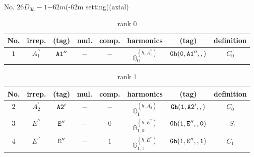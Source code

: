 \documentclass[fleqn,8pt]{jsarticle}
\begin{document}
\setcounter{MaxMatrixCols}{16}

\begin{center}
\LARGE
No. 26\quad$D_{3h}-1$\quad$-62m$\quad(-62m setting)\quad[ hexagonal ] (axial)
\end{center}
\begin{table}[ht!]
\begin{center}
\caption{rank 0}
\renewcommand{\arraystretch}{1.3}
\begin{tabular}{cccccccc} \hline \hline
No. & irrep. & (tag) & mul. & comp. & harmonics & (tag) & definition \\ \hline
$ 1 $ & $ A_{1}^{\prime\prime} $ & $ {\tt A1''} $ & $ - $ & $ - $ & $ \mathbb{G}_{0}^{(h,A_{1}^{\prime\prime})} $ & $ {\tt Gh(0,A1'',,)} $ & $ C_{0} $ \\
 \hline \hline
\end{tabular}
\end{center}
\end{table}
\begin{table}[ht!]
\begin{center}
\caption{rank 1}
\renewcommand{\arraystretch}{1.3}
\begin{tabular}{cccccccc} \hline \hline
No. & irrep. & (tag) & mul. & comp. & harmonics & (tag) & definition \\ \hline
$ 2 $ & $ A_{2}^{\prime} $ & $ {\tt A2'} $ & $ - $ & $ - $ & $ \mathbb{G}_{1}^{(h,A_{2}^{\prime})} $ & $ {\tt Gh(1,A2',,)} $ & $ C_{0} $ \\
$ 3 $ & $ E^{\prime\prime} $ & $ {\tt E''} $ & $ - $ & $ 0 $ & $ \mathbb{G}_{1,0}^{(h,E^{\prime\prime})} $ & $ {\tt Gh(1,E'',,0)} $ & $ - S_{1} $ \\
$ 4 $ & $ E^{\prime\prime} $ & $ {\tt E''} $ & $ - $ & $ 1 $ & $ \mathbb{G}_{1,1}^{(h,E^{\prime\prime})} $ & $ {\tt Gh(1,E'',,1)} $ & $ C_{1} $ \\
 \hline \hline
\end{tabular}
\end{center}
\end{table}
\end{document}
